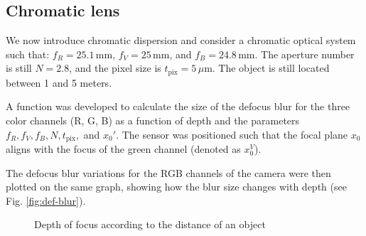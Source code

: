 \documentclass[10pt,letterpaper]{article}
\begin{document}
\subsection*{Chromatic lens}
We now introduce chromatic dispersion and consider a chromatic optical system such that: $f_R = 25.1 \, \text{mm}$, $f_V = 25 \, \text{mm}$, and $f_B = 24.8 \, \text{mm}$. The aperture number is still $N = 2.8$, and the pixel size is $t_{\text{pix}} = 5 \, \mu\text{m}$. The object is still located between 1 and 5 meters.

A function was developed to calculate the size of the defocus blur for the three color channels (R, G, B) as a function of depth and the parameters $f_R, f_V, f_B, N, t_{\text{pix}},$ and $x_0'$. The sensor was positioned such that the focal plane $x_0$ aligns with the focus of the green channel (denoted as $x_0^V$).

The defocus blur variations for the RGB channels of the camera were then plotted on the same graph, showing how the blur size changes with depth (see Fig. \ref{fig:def-blur}).

\begin{figure}[h]
    \centering
	\caption{Depth of focus according to the distance of an object}
\end{figure}
\end{document}
